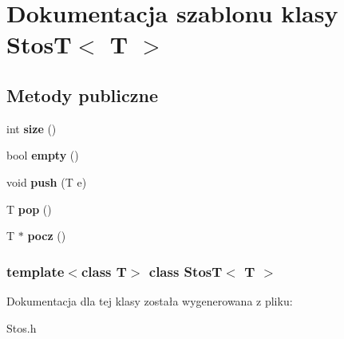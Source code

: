\hypertarget{class_stos_t}{\section{\-Dokumentacja szablonu klasy \-Stos\-T$<$ \-T $>$}
\label{class_stos_t}
}
\subsection*{\-Metody publiczne}
\begin{DoxyCompactItemize}
\item 
\hypertarget{class_stos_t_a5e3e0a5bb07ae2cecbff86705c6e7710}{int {\bfseries size} ()}\label{class_stos_t_a5e3e0a5bb07ae2cecbff86705c6e7710}

\item 
\hypertarget{class_stos_t_afb1cd36b9ec9dd8c9aa5b832b09bff9e}{bool {\bfseries empty} ()}\label{class_stos_t_afb1cd36b9ec9dd8c9aa5b832b09bff9e}

\item 
\hypertarget{class_stos_t_a55f36558cb39bded28a1ed3c37cbcee6}{void {\bfseries push} (\-T e)}\label{class_stos_t_a55f36558cb39bded28a1ed3c37cbcee6}

\item 
\hypertarget{class_stos_t_a3024f48043bfdbca81df37c11af4db87}{\-T {\bfseries pop} ()}\label{class_stos_t_a3024f48043bfdbca81df37c11af4db87}

\item 
\hypertarget{class_stos_t_a02a6620a75da4bc9d324475c2b8e1d3a}{\-T $\ast$ {\bfseries pocz} ()}\label{class_stos_t_a02a6620a75da4bc9d324475c2b8e1d3a}

\end{DoxyCompactItemize}
\subsubsection*{template$<$class T$>$ class Stos\-T$<$ T $>$}



\-Dokumentacja dla tej klasy została wygenerowana z pliku\-:\begin{DoxyCompactItemize}
\item 
\-Stos.\-h\end{DoxyCompactItemize}
